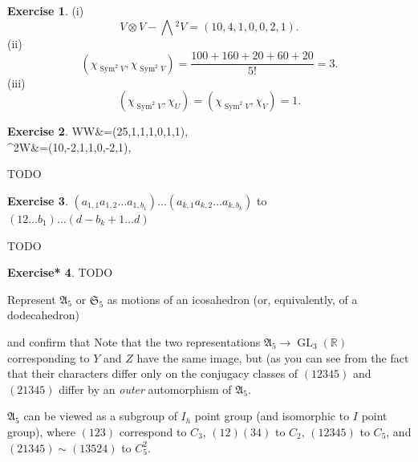 \documentclass[12pt, letterpaper]{article}
\newcommand{\re}{\mathbb{R}}
\newcommand{\GL}{\operatorname{GL}}
\newcommand{\Sym}{\operatorname{Sym}}
\newcommand{\ext}[1]{\bigwedge\!^{#1}}
\newcommand{\red}[1]{{\color{red} #1}}
\newcommand{\blue}[1]{{\color{blue} #1}}
\newenvironment{eqlong}{\equation\aligned}{\endaligned\endequation}
\theoremstyle{definition}
\theoremstyle{remark}
\theoremstyle{definition}
\newtheorem{exe}{Exercise}[section]
\newtheorem{exe*}[exe]{Exercise*}
\theoremstyle{plain}
\numberwithin{equation}{section}
\begin{document}
	\begin{exe}
		(i) \[V\otimes V - \ext{2}V=(10,4,1,0,0,2,1).\]
		(ii) \[(\chi_{\Sym^2V},\chi_{\Sym^2V})=\frac{100+160+20+60+20}{5!}=3. \]
		(iii) \[(\chi_{\Sym^2V},\chi_{U})=(\chi_{\Sym^2V},\chi_{V})=1. \]
	\end{exe}

	\begin{exe}
		\begin{eqlong}
			W\otimes W&=(25,1,1,1,0,1,1),\\
			\ext{2}W&=(10,-2,1,1,0,-2,1),\\
		\end{eqlong}
	
		\red{TODO}
	\end{exe}

	\begin{exe}
		$(a_{1,1}a_{1,2}\dots a_{1,b_1})\dots(a_{k,1}a_{k,2}\dots a_{k,b_k})$
		to
		$(12\dots b_1)\dots(d-b_k+1\dots d)$
		
		\red{TODO}
	\end{exe}
	\begin{exe*}
		\red{TODO}
	\end{exe*}
	
	\red{Represent $\mathfrak{A}_5$ or $\mathfrak{S}_5$ as motions of an icosahedron (or, equivalently, of a dodecahedron)}
	
	\red{and confirm that}
	 Note that the two representations 
	$\mathfrak{A}_5\to\GL_3(\re)$ corresponding to $Y$ and $Z$ have the same image, but (as you 
	can see from the fact that their characters differ only on the conjugacy classes 
	of $(12345)$ and $(21345)$ differ by an \textit{outer} automorphism of $\mathfrak{A}_5$.
	
	\begin{center}			
	\end{center}

	\blue{$\mathfrak{A}_5$ can be viewed as a subgroup of $I_h$ point group (and isomorphic to $I$ point group),
	where $(123)$ correspond to $C_3$, $(12)(34)$ to $C_2$,
	$(12345)$ to $C_5$, and $(21345)\sim(13524)$ to $C_5^2$.}
\end{document}

